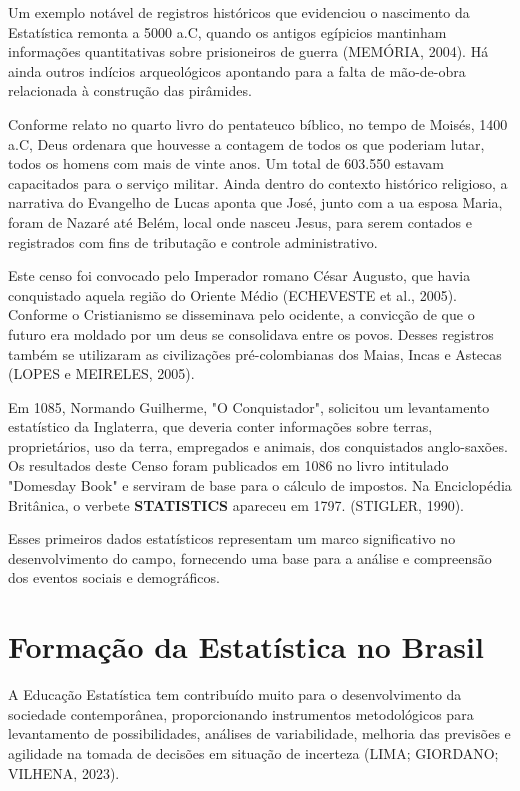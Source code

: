 Um exemplo notável de registros históricos que evidenciou o nascimento da Estatística remonta a 5000 a.C, quando os antigos egípicios mantinham informações quantitativas sobre prisioneiros de guerra (MEMÓRIA, 2004). Há ainda outros indícios arqueológicos apontando para a falta de mão-de-obra relacionada à construção das pirâmides.\vskip0.3cm

Conforme relato no quarto livro do pentateuco bíblico, no tempo de Moisés, 1400 a.C, Deus ordenara que houvesse a contagem de todos os que poderiam lutar, todos os homens com mais de vinte anos. Um total de 603.550 estavam capacitados para o serviço militar. Ainda dentro do contexto histórico religioso, a narrativa do Evangelho de Lucas aponta que José, junto com a ua esposa Maria, foram de Nazaré até Belém, local onde nasceu Jesus, para serem contados e registrados com fins de tributação e controle administrativo.

\newpage
Este censo foi convocado pelo Imperador romano César Augusto, que havia conquistado aquela região do Oriente Médio (ECHEVESTE et al., 2005). Conforme o Cristianismo se disseminava pelo ocidente, a convicção de que o futuro era moldado por um deus se consolidava entre os povos. Desses registros também se utilizaram as civilizações pré-colombianas dos Maias, Incas e Astecas (LOPES e  MEIRELES, 2005).\vskip0.3cm

Em 1085, Normando Guilherme, "O Conquistador", solicitou um levantamento estatístico da Inglaterra, que deveria conter informações sobre terras, proprietários, uso da terra, empregados e animais, dos conquistados anglo-saxões. Os resultados deste Censo foram publicados em 1086 no livro intitulado "Domesday Book" e serviram de base para o cálculo de impostos. Na Enciclopédia Britânica, o verbete \textbf{STATISTICS} apareceu em 1797. (STIGLER, 1990).\vskip0.3cm

Esses primeiros dados estatísticos representam um marco significativo no desenvolvimento do campo, fornecendo uma base para a análise e compreensão dos eventos sociais e demográficos.

\section{Formação da Estatística no Brasil}

A Educação Estatística tem contribuído muito para o desenvolvimento da sociedade contemporânea, proporcionando instrumentos metodológicos para levantamento de possibilidades, análises de variabilidade, melhoria das previsões e agilidade na tomada de decisões em situação de incerteza (LIMA; GIORDANO; VILHENA, 2023).\vskip0.3cm


